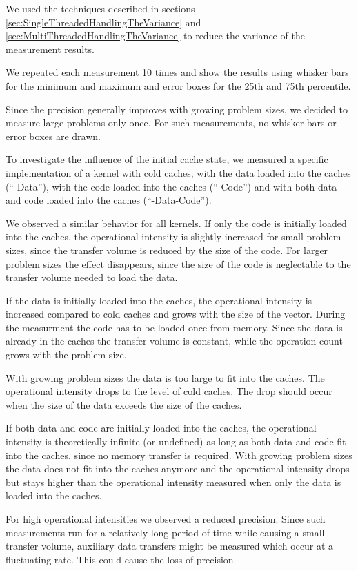 \documentclass[a4paper,12pt]{article}
\begin{document}
We used the techniques described in sections
\ref{sec:SingleThreadedHandlingTheVariance} and
\ref{sec:MultiThreadedHandlingTheVariance} to reduce the variance of the
measurement results. 

We repeated each measurement 10 times and show the results using whisker bars
for the minimum and maximum and error boxes for the 25th and 75th percentile. 

Since the precision generally improves with growing problem sizes, we decided to
measure large problems only once. For such measurements, no whisker bars or
error boxes are drawn.

To investigate the influence of the initial cache state, we measured a specific
implementation of a kernel with cold caches, with the data loaded into the
caches (``-Data''), with the code loaded into the caches (``-Code'') and with
both data and code loaded into the caches (``-Data-Code'').

We observed a similar behavior for all kernels. If only the code is initially
loaded into the caches, the operational intensity is slightly increased for
small problem sizes, since the transfer volume is reduced by the size of the
code. For larger problem sizes the effect disappears, since the size of
the code is neglectable to the transfer volume needed to load the data.

If the data is initially loaded into the caches, the operational intensity is
increased compared to cold caches and grows with the size of the vector.
During the measurment the code has to be loaded once from memory.
Since the data is already in the caches the transfer volume is constant, while
the operation count grows with the problem size.

With growing problem sizes the data is too large to fit into the caches.
The operational intensity drops to the level of cold caches. The drop should
occur when the size of the data exceeds the size of the caches.

If both data and code are initially loaded into the caches, the operational
intensity is theoretically infinite (or undefined) as long as both data and
code fit into the caches, since no memory transfer is required. With growing
problem sizes the data does not fit into the caches anymore and the operational
intensity drops but stays higher than the operational intensity measured when
only the data is loaded into the caches.

For high operational intensities we observed a reduced precision. Since such
measurements run for a relatively long period of time while causing a small
transfer volume, auxiliary data transfers might be measured which occur at a
fluctuating rate. This could cause the loss of precision.
\end{document}
